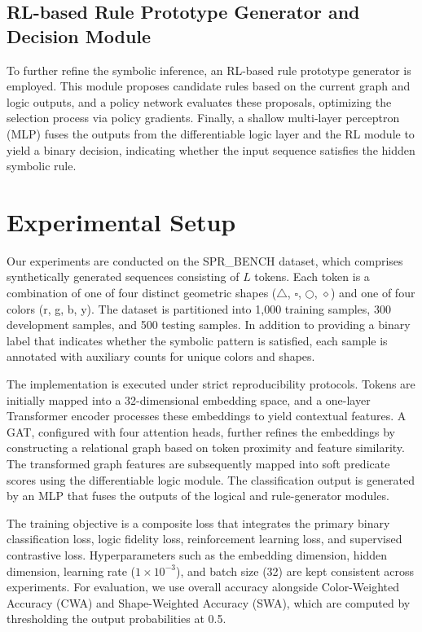 \documentclass{article}
\begin{document}
\subsection{RL-based Rule Prototype Generator and Decision Module}
To further refine the symbolic inference, an RL-based rule prototype generator is employed. This module proposes candidate rules based on the current graph and logic outputs, and a policy network evaluates these proposals, optimizing the selection process via policy gradients. Finally, a shallow multi-layer perceptron (MLP) fuses the outputs from the differentiable logic layer and the RL module to yield a binary decision, indicating whether the input sequence satisfies the hidden symbolic rule.

\section{Experimental Setup}
Our experiments are conducted on the SPR\_BENCH dataset, which comprises synthetically generated sequences consisting of \(L\) tokens. Each token is a combination of one of four distinct geometric shapes (\(\triangle\), \(\square\), \(\bigcirc\), \(\diamond\)) and one of four colors (r, g, b, y). The dataset is partitioned into 1,000 training samples, 300 development samples, and 500 testing samples. In addition to providing a binary label that indicates whether the symbolic pattern is satisfied, each sample is annotated with auxiliary counts for unique colors and shapes.

The implementation is executed under strict reproducibility protocols. Tokens are initially mapped into a 32-dimensional embedding space, and a one-layer Transformer encoder processes these embeddings to yield contextual features. A GAT, configured with four attention heads, further refines the embeddings by constructing a relational graph based on token proximity and feature similarity. The transformed graph features are subsequently mapped into soft predicate scores using the differentiable logic module. The classification output is generated by an MLP that fuses the outputs of the logical and rule-generator modules.

The training objective is a composite loss that integrates the primary binary classification loss, logic fidelity loss, reinforcement learning loss, and supervised contrastive loss. Hyperparameters such as the embedding dimension, hidden dimension, learning rate (\(1\times10^{-3}\)), and batch size (32) are kept consistent across experiments. For evaluation, we use overall accuracy alongside Color-Weighted Accuracy (CWA) and Shape-Weighted Accuracy (SWA), which are computed by thresholding the output probabilities at 0.5. 
\end{document}
